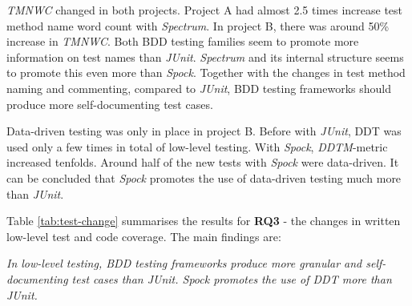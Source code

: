 \textit{TMNWC} changed in both projects. Project A had almost 2.5 times increase test method name word count with \textit{Spectrum}. In
project B, there was around 50\% increase in \textit{TMNWC}. Both BDD testing families seem to promote more information on test
names than \textit{JUnit}. \textit{Spectrum} and its internal structure seems to promote this even more than \textit{Spock}. Together with the changes
in test method naming and commenting, compared to \textit{JUnit}, BDD testing frameworks should produce more self-documenting test cases.

Data-driven testing was only in place in project B. Before with \textit{JUnit}, DDT was used only a few times in total
of low-level testing. With \textit{Spock}, \textit{DDTM}-metric increased tenfolds. Around half of the new tests with \textit{Spock} were data-driven.
It can be concluded that \textit{Spock} promotes the use of data-driven testing much more than \textit{JUnit}.

Table \ref{tab:test-change} summarises the results for \textbf{RQ3} - the changes in written low-level test and code coverage.
The main findings are:

\begin{center}
\begin{topbot}
\textit{In low-level testing, BDD testing frameworks produce more granular and self-documenting test cases than JUnit.
Spock promotes the use of DDT more than JUnit.}
\end{topbot}
\end{center}

